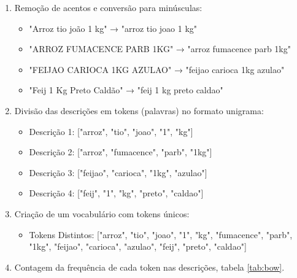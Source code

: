 \begin{enumerate}
    \item Remoção de acentos e conversão para minúsculas:
    \begin{itemize}
        \item "Arroz tio joão 1 kg" → "arroz tio joao 1 kg"
        \item "ARROZ FUMACENCE PARB 1KG" → "arroz fumacence parb 1kg"
        \item "FEIJAO CARIOCA 1KG AZULAO" → "feijao carioca 1kg azulao"
        \item "Feij 1 Kg Preto Caldão" → "feij 1 kg preto caldao"
    \end{itemize}
    \item Divisão das descrições em tokens (palavras) no formato unigrama:
    \begin{itemize}
        \item Descrição 1: ["arroz", "tio", "joao", "1", "kg"]
        \item Descrição 2: ["arroz", "fumacence", "parb", "1kg"]
        \item Descrição 3: ["feijao", "carioca", "1kg", "azulao"]
        \item Descrição 4: ["feij", "1", "kg", "preto", "caldao"]
    \end{itemize}
    \item Criação de um vocabulário com tokens únicos:
    \begin{itemize}
        \item Tokens Distintos: ["arroz", "tio", "joao", "1", "kg", "fumacence", "parb", "1kg", "feijao", "carioca", "azulao", "feij", "preto", "caldao"]
    \end{itemize}
    \item Contagem da frequência de cada token nas descrições, tabela \ref{tab:bow}.
\end{enumerate}

